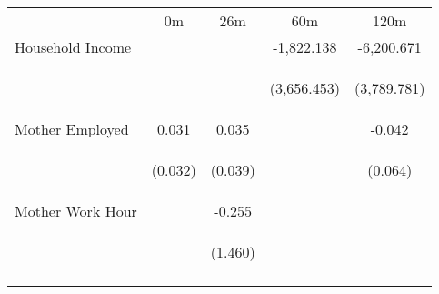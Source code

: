 \begin{tabular}{lcccc}
\hline \noalign{\smallskip} & 0m & 26m & 60m & 120m\\
\noalign{\smallskip}\hline \noalign{\smallskip}Household Income &  &  & -1,822.138 & -6,200.671\\
 & \begin{footnotesize}\end{footnotesize} & \begin{footnotesize}\end{footnotesize} & \begin{footnotesize}(3,656.453)\end{footnotesize} & \begin{footnotesize}(3,789.781)\end{footnotesize}\\
\noalign{\smallskip}Mother Employed & 0.031 & 0.035 &  & -0.042\\
 & \begin{footnotesize}(0.032)\end{footnotesize} & \begin{footnotesize}(0.039)\end{footnotesize} & \begin{footnotesize}\end{footnotesize} & \begin{footnotesize}(0.064)\end{footnotesize}\\
\noalign{\smallskip}Mother Work Hour &  & -0.255 &  & \\
 & \begin{footnotesize}\end{footnotesize} & \begin{footnotesize}(1.460)\end{footnotesize} & \begin{footnotesize}\end{footnotesize} & \begin{footnotesize}\end{footnotesize}\\
\noalign{\smallskip}\hline\end{tabular}\\
